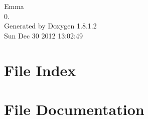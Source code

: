\documentclass{book}
\begin{document}
\hypersetup{pageanchor=false,citecolor=blue}
\begin{titlepage}
\vspace*{7cm}
\begin{center}
{\Large Emma \\[1ex]\large 0. }\\
\vspace*{1cm}
{\large Generated by Doxygen 1.8.1.2}\\
\vspace*{0.5cm}
{\small Sun Dec 30 2012 13:02:49}\\
\end{center}
\end{titlepage}
\clearemptydoublepage
{}
\tableofcontents
\clearemptydoublepage
{}
\hypersetup{pageanchor=true,citecolor=blue}
\chapter{File Index}

\chapter{File Documentation}
























\printindex
\end{document}
